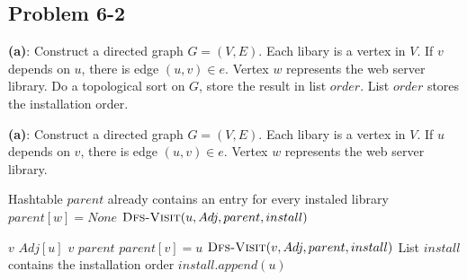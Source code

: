 \documentclass[12pt,twoside]{article}
\begin{document}
\subsection{Problem 6-2}
\textbf{(a)}: Construct a directed graph $G = (V, E)$. Each libary is a vertex
in $V$. If $v$ depends on $u$, there is edge $(u, v) \in e$. Vertex $w$
represents the web server library. Do a topological sort on $G$, store the
result in list $order$. List $order$ stores the installation order.

\textbf{(a)}: Construct a directed graph $G = (V, E)$. Each libary is a vertex
in $V$. If $u$ depends on $v$, there is edge $(u, v) \in e$. Vertex $w$
represents the web server library.

\begin{codebox}
\li \Comment Hashtable $parent$ already contains an entry for every instaled library
\li $parent[w] = None$
\li $\textnormal{\scshape Dfs-Visit}(u, Adj, parent, install)$
\end{codebox}

\begin{codebox}
\li \For $v$ \In $Adj[u]$
\li \Do \If $v$ \Not \In $parent$
\li \Then $parent[v] = u$
\li $\textnormal{\scshape Dfs-Visit}(v, Adj, parent, install)$
\End \End
\li \Comment List $install$ contains the installation order
\li $install.append(u)$
\end{codebox}
\end{document}
